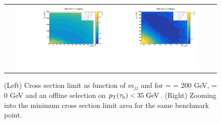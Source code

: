 \begin{figure}[tbh!]
	\centering
	\begin{tabular}{cc}
		\includegraphics[width=0.45\textwidth]{analysis/pics/JetInvMass_vs_MET_xsec_chi200_lsp000_taupt35.pdf}
		\includegraphics[width=0.45\textwidth]{analysis/pics/JetInvMass_vs_MET_xsec_chi200_lsp000_taupt35_zoom.pdf} 		
	\end{tabular}
	\caption{(Left) Cross section limit as function of $m_{jj}$ and \met for \charginopm = \neutralinotwo = 200 GeV, \neutralinoone = 0 GeV and an offline selection on $p_{\text{T}}(\tau_{\text{h}}) <  35\;\text{Ge}\kern-0.06667em\text{V}$. (Right) Zooming into the minimum cross section limit area for the same benchmark point.}
	\label{fig::JetInvMass_vs_MET_xsec_chi200_lsp000_taupt35}
\end{figure}

